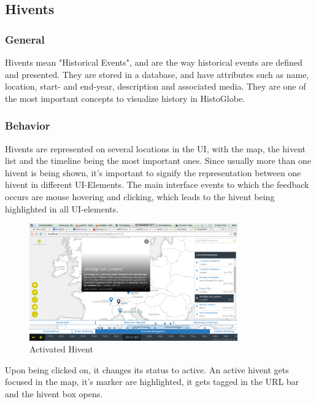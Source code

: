 \subsection{Hivents} %
\label{sec:hivents}
\subsubsection{General} %
\label{sub:general}
Hivents mean "Historical Events", and are the way historical events are defined and presented. They are stored in a database, and have attributes such as name, location, start- and end-year, description and associated media.
They are one of the most important concepts to visualize history in HistoGlobe.

\subsubsection{Behavior} %
\label{sub:behaviour}
Hivents are represented on several locations in the UI, with the map, the hivent list and the timeline being the most important ones.
Since usually more than one hivent is being shown, it's important to signify the representation between one hivent in different UI-Elements.
The main interface events to which the feedback occurs are mouse hovering and clicking, which leads to the hivent being highlighted in all UI-elements.

  \begin{figure}[here]
\begin{center}
  \includegraphics[width=0.8\textwidth]{graphics/activated_hivent.png}
  \end{center}

  \caption{Activated Hivent}
  \label{fig:activated_hivent}
  \end{figure}
Upon being clicked on, it changes its status to active. An active hivent gets focused in the map, it's marker are highlighted, it gets tagged in the URL bar and the hivent box opens.

